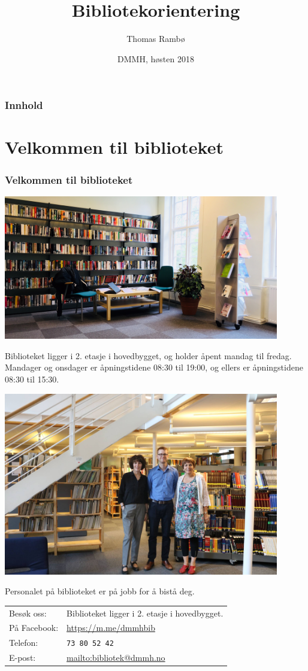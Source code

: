 \documentclass{beamer}
\title{Bibliotekorientering}
\author{Thomas Rambø\inst{1}}
\institute[DMMH-biblioteket]{
  \inst{1}
  Biblioteket\\
  Dronning Mauds Minne Høgskole
}
\date[DMMH 2018]{DMMH, høsten 2018}
\begin{document}
\frame{\titlepage}
\begin{frame}
  \frametitle{Innhold}
  \tableofcontents
\end{frame}

\section{Velkommen til biblioteket}
\begin{frame}
  \frametitle{Velkommen til biblioteket}
  \centering
  \includegraphics[width=0.90\textwidth]{media/nytt-bibliotek.png}
\end{frame}
\begin{frame}
  Biblioteket ligger i 2. etasje i hovedbygget, og holder åpent mandag til fredag. Mandager og onsdager er åpningstidene \alert{08:30 til 19:00}, og ellers er åpningstidene \alert{08:30 til 15:30}.
\end{frame}
\begin{frame}
  \centering
  \includegraphics[width=0.90\textwidth]{media/bibliotekansatte.jpg}
\end{frame}
\begin{frame}
  Personalet på biblioteket er på jobb for å bistå deg.

  \vfill
  \begin{tabular}{ l | l }
    Besøk oss: & Biblioteket ligger i 2. etasje i hovedbygget. \\
    På Facebook: & \url{https://m.me/dmmhbib} \\
    Telefon: & \texttt{73 80 52 42} \\
    E-post: & \url{mailto:bibliotek@dmmh.no}
  \end{tabular}
\end{frame}
\end{document}
